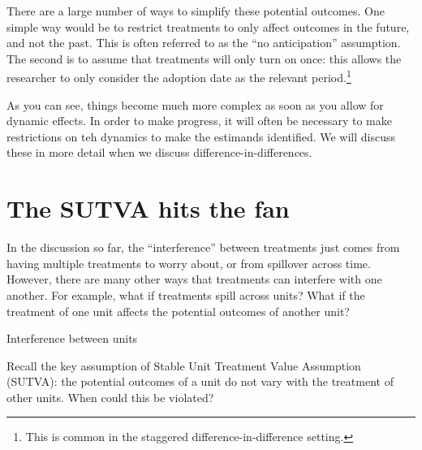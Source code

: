 \documentclass{tufte-handout}
\theoremstyle{break}
\begin{document}
There are a large number of ways to simplify these potential outcomes. One simple way would be to restrict treatments to only affect outcomes in the future, and not the past. This is often referred to as the ``no anticipation'' assumption. The second is to assume that treatments will only turn on once: this allows the researcher to only consider the adoption date as the relevant period.\footnote{This is common in the staggered difference-in-difference setting.} 

As you can see, things become much more complex as soon as you allow for dynamic effects. In order to make progress, it will often be necessary to make restrictions on teh dynamics to make the estimands identified. We will discuss these in more detail when we discuss difference-in-differences.

\section{The SUTVA hits the fan}

In the discussion so far, the ``interference'' between treatments just comes from having multiple treatments to worry about, or from spillover across time. However, there are many other ways that treatments can interfere with one another. For example, what if treatments spill across units? What if the treatment of one unit affects the potential outcomes of another unit?

\begin{marginfigure}
  
  \caption{Interference between units}
  \label{fig:interference}
\end{marginfigure}
Recall the key assumption of Stable Unit Treatment Value Assumption (SUTVA): the potential outcomes of a unit do not vary with the treatment of other units. When could this be violated?
\end{document}
